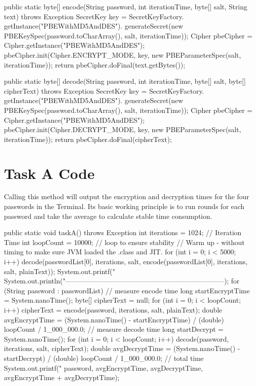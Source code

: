 \documentclass[12pt,a4paper]{article}
\begin{document}
\begin{mycode}
public static byte[] encode(String password, int iterationTime, byte[] salt, String text) throws Exception {
    SecretKey key = SecretKeyFactory.
            getInstance("PBEWithMD5AndDES").
            generateSecret(new PBEKeySpec(password.toCharArray(), salt, iterationTime));
    Cipher pbeCipher = Cipher.getInstance("PBEWithMD5AndDES");
    pbeCipher.init(Cipher.ENCRYPT_MODE, key, new PBEParameterSpec(salt, iterationTime));
    return pbeCipher.doFinal(text.getBytes());
}

public static byte[] decode(String password, int iterationTime, byte[] salt, byte[] cipherText) throws Exception {
    SecretKey key = SecretKeyFactory.
            getInstance("PBEWithMD5AndDES").
            generateSecret(new PBEKeySpec(password.toCharArray(), salt, iterationTime));
    Cipher pbeCipher = Cipher.getInstance("PBEWithMD5AndDES");
    pbeCipher.init(Cipher.DECRYPT_MODE, key, new PBEParameterSpec(salt, iterationTime));
    return pbeCipher.doFinal(cipherText);
}
\end{mycode}

\section{Task A Code}

Calling this method will output the encryption and decryption times for the four passwords in the Terminal. Its basic working principle is to run  rounds for each password and take the average to calculate stable time consumption.

\begin{mycode}
public static void taskA() throws Exception{
    int iterations = 1024; // Iteration Time
    int loopCount = 10000; // loop to ensure stability
    // Warm up - without timing to make sure JVM loaded the .class and JIT.
    for (int i = 0; i < 5000; i++)
        decode(passwordList[0], iterations, salt, encode(passwordList[0], iterations, salt, plainText));
    System.out.printf("%
    System.out.println("---------------------------------------------------------------------);
    for (String password : passwordList) {
        // measure encode time
        long startEncryptTime = System.nanoTime();
        byte[] cipherText = null;
        for (int i = 0; i < loopCount; i++)
            cipherText = encode(password, iterations, salt, plainText);
        double avgEncryptTime = (System.nanoTime() - startEncryptTime) / (double) loopCount / 1_000_000.0;
        // measure decode time
        long startDecrypt = System.nanoTime();
        for (int i = 0; i < loopCount; i++) decode(password, iterations, salt, cipherText);
        double avgDecryptTime = (System.nanoTime() - startDecrypt) / (double) loopCount / 1_000_000.0;
        // total time
        System.out.printf("%
                          password, avgEncryptTime, avgDecryptTime, avgEncryptTime + avgDecryptTime);
    }
}
\end{mycode}
\end{document}
